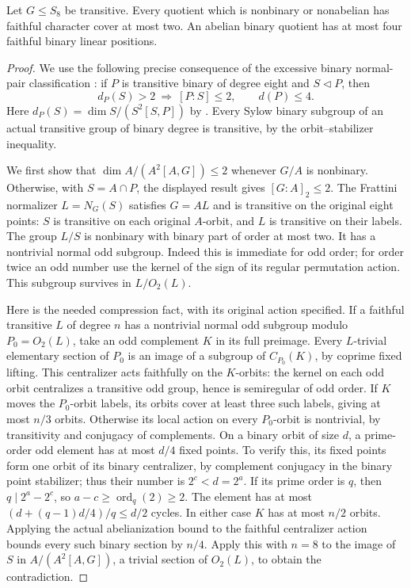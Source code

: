 \begin{lemma}
\label{lem:eight-quotient-cover}
Let $G\leq S_8$ be transitive. Every quotient which is nonbinary or
nonabelian has faithful character cover at most two. An abelian
binary quotient has at most four faithful binary linear positions.
\end{lemma}
\begin{proof}
We use the following precise consequence of the excessive binary
normal-pair classification
\cite[Definition 5.1 and Proposition 5.3(i)]{RoneyDougalTracey2025}:
if $P$ is transitive binary of degree eight and $S\lhd P$, then
\[
 d_P(S)>2\ \Longrightarrow\ [P:S]\leq2,
 \qquad d(P)\leq4.
\]
Here $d_P(S)=\dim S/(S^2[S,P])$ by
\cite[Lemma 2.5(i)]{RoneyDougalTracey2025}.
Every Sylow binary subgroup of an actual transitive group of binary
degree is transitive, by the orbit--stabilizer inequality.

We first show that $\dim A/(A^2[A,G])\leq2$ whenever $G/A$ is
nonbinary. Otherwise, with $S=A\cap P$, the displayed result gives
$[G:A]_2\leq2$. The Frattini normalizer $L=N_G(S)$ satisfies $G=AL$
and is transitive on the original eight points: $S$ is transitive on
each original $A$-orbit, and $L$ is transitive on their labels.
The group $L/S$ is nonbinary with binary part of order at most two.
It has a nontrivial normal odd subgroup. Indeed this is immediate
for odd order; for order twice an odd number use the kernel of the
sign of its regular permutation action. This subgroup survives in
$L/O_2(L)$.

Here is the needed compression fact, with its original action
specified. If a faithful transitive $L$ of degree $n$ has a nontrivial
normal odd subgroup modulo $P_0=O_2(L)$, take an odd complement $K$
in its full preimage. Every $L$-trivial elementary section of $P_0$
is an image of a subgroup of $C_{P_0}(K)$, by coprime fixed lifting.
This centralizer acts faithfully on the $K$-orbits: the kernel on
each odd orbit centralizes a transitive odd group, hence is
semiregular of odd order. If $K$ moves the $P_0$-orbit labels, its
orbits cover at least three such labels, giving at most $n/3$ orbits.
Otherwise its local action on every $P_0$-orbit is nontrivial, by
transitivity and conjugacy of complements. On a binary orbit of
size $d$, a prime-order odd element has at most $d/4$ fixed points.
To verify this, its fixed points form one orbit of its binary
centralizer, by complement conjugacy in the binary point stabilizer;
thus their number is $2^c<d=2^a$. If its prime order is $q$, then
$q\mid 2^a-2^c$, so $a-c\geq\operatorname{ord}_q(2)\geq2$.
The element has at most $(d+(q-1)d/4)/q\leq d/2$ cycles.
In either case $K$ has at most $n/2$ orbits. Applying the actual
abelianization bound \cite[Theorem 2.8]{RoneyDougalTracey2025} to the
faithful centralizer action bounds every such binary section by
$n/4$. Apply this with $n=8$ to the image of $S$ in
$A/(A^2[A,G])$, a trivial section of $O_2(L)$, to obtain the
contradiction.


\end{proof}
